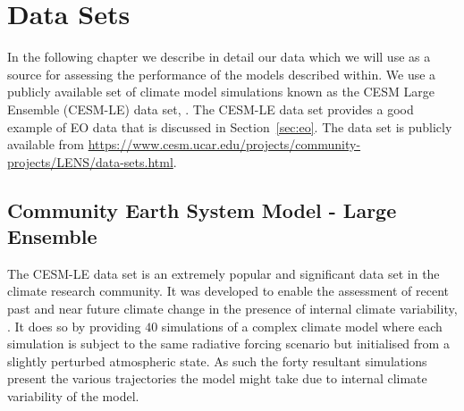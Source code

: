 

\chapter{Data Sets\label{cha:data}}  %

\ifpdf
    \graphicspath{{Chapter2/Figs/Raster/}{Chapter2/Figs/PDF/}{Chapter2/Figs/}}
\else
    \graphicspath{{Chapter2/Figs/Vector/}{Chapter2/Figs/}}
\fi

In the following chapter we describe in detail our data which we will use as a source for assessing the performance of the models described within.
We use a publicly available set of climate model simulations known as the CESM Large Ensemble (CESM-LE) data set, \citep{kay_community_2015}.
The CESM-LE data set provides a good example of EO data that is discussed in Section~\ref{sec:eo}. The data set is publicly available from \url{https://www.cesm.ucar.edu/projects/community-projects/LENS/data-sets.html}.

 \section[CESM-LE]{\label{sec:cesmle}Community Earth System Model - Large Ensemble}
 The CESM-LE data set is an extremely popular and significant data set in the climate research community.
 It was developed to enable the assessment of recent past and near future climate change in the presence of internal climate variability, \citep{kay_community_2015}.
 It does so by providing $40$ simulations of a complex climate model where each simulation is subject to the same radiative forcing scenario but initialised from a slightly perturbed atmospheric state.
 As such the forty resultant simulations present the various trajectories the model might take due to internal climate variability of the model. 
 
